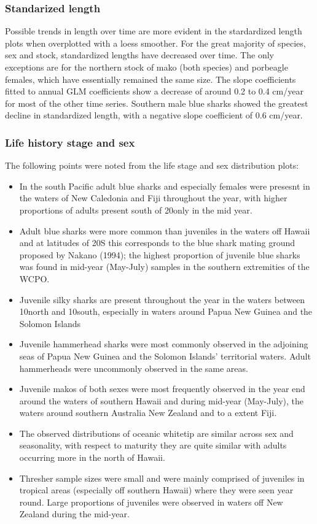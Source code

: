 \documentclass[12pt]{SCreport}
\begin{document}
\subsubsection{Standarized length}
Possible trends in length over time are more evident in the stardardized length plots when overplotted with a loess smoother.  For the great majority of species, sex and stock, standardized lengths have decreased over time.  The only exceptions are for the northern stock of mako (both species) and porbeagle females, which have essentially remained the same size.  The slope coefficients fitted to annual GLM coefficients show a decrease of around 0.2 to 0.4 cm/year for most of the other time series.  Southern male blue sharks showed the greatest decline in standardized length, with a negative slope coefficient of 0.6 cm/year.

\subsubsection{Life history stage and sex}
The following points were noted from the life stage and sex distribution plots:

 
\begin{itemize}
  \item In the south Pacific adult blue sharks and especially females were presesnt in the waters of New Caledonia and Fiji throughout the year, with higher proportions of adults present south of 20\degree only in the mid year. 
  \item Adult blue sharks were more common than juveniles in the waters off Hawaii and at latitudes of 20\degree S this corresponds to the blue shark mating ground proposed by Nakano (1994); the highest proportion of juvenile blue sharks was found in mid-year (May-July) samples in the southern extremities of the WCPO.
  \item  Juvenile silky sharks are present throughout the year in the waters between 10\degree north and 10\degree south, especially in waters around Papua New Guinea and the Solomon Islands
\item Juvenile hammerhead sharks were most commonly observed in the adjoining seas of Papua New Guinea and the Solomon Islands' territorial waters.    Adult hammerheads were uncommonly observed in the same areas.  

\item Juvenile makos of both sexes were most frequently observed in the year end around the waters of southern Hawaii and during  mid-year (May-July), the waters around southern Australia New Zealand and to a extent Fiji.  

\item The observed distributions of oceanic whitetip are similar across sex and seasonality, with respect to maturity they are quite similar with adults occurring more in the north of Hawaii.

\item Thresher sample sizes were small and were mainly comprised of juveniles in tropical areas (especially off southern Hawaii) where they were seen year round. Large proportions of juveniles were observed in waters off New Zealand during the mid-year.
\end{itemize}
\end{document}
